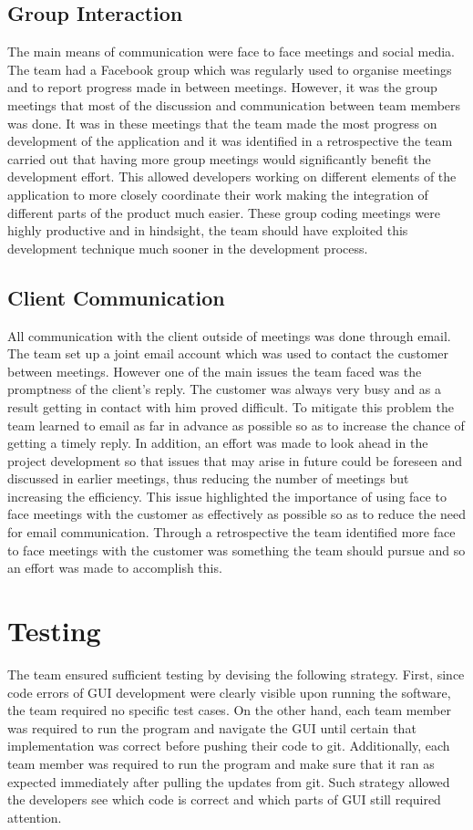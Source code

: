 \documentclass{l3proj}
\begin{document}
\subsection{Group Interaction}
The main means of communication were face to face meetings and social media. The team had a Facebook group which was regularly used to organise meetings and to report progress made in between meetings. However, it was the group meetings that most of the discussion and communication between team members was done. It was in these meetings that the team made the most progress on development of the application and it was identified in a retrospective the team carried out that having more group meetings would significantly benefit the development effort. This allowed developers working on different elements of the application to more closely coordinate their work making the integration of different parts of the product much easier. These group coding meetings were highly productive and in hindsight, the team should have exploited this development technique much sooner in the development process.

\subsection{Client Communication}
All communication with the client outside of meetings was done through email. The team set up a joint email account which was used to contact the customer between meetings. However one of the main issues the team faced was the promptness of the client's reply. The customer was always very busy and as a result getting in contact with him proved difficult. To mitigate this problem the team learned to email as far in advance as possible so as to increase the chance of getting a timely reply. In addition, an effort was made to look ahead in the project development so that issues that may arise in future could be foreseen and discussed in earlier meetings, thus reducing the number of meetings but increasing the efficiency. This issue highlighted the importance of using face to face meetings with the customer as effectively as possible so as to reduce the need for email communication. Through a retrospective the team identified more face to face meetings with the customer was something the team should pursue and so an effort was made to accomplish this.

\section{Testing}
\label{sec:testing}
The team ensured sufficient testing by devising the following strategy. First, since code errors of GUI development were clearly visible upon running the software, the team required no specific test cases. On the other hand, each team member was required to run the program and navigate the GUI until certain that implementation was correct before pushing their code to git. Additionally, each team member was required to run the program and make sure that it ran as expected immediately after pulling the updates from git. Such strategy allowed the developers see which code is correct and which parts of GUI still required attention.
\end{document}
